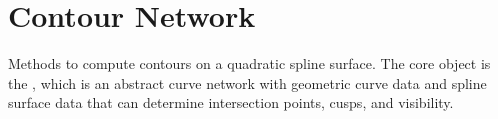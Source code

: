 \chapter{Contour Network}
\hypertarget{md_src_2contour__network_2_r_e_a_d_m_e}{}\label{md_src_2contour__network_2_r_e_a_d_m_e}
\label{md_src_2contour__network_2_r_e_a_d_m_e_autotoc_md0}%
%
 Methods to compute contours on a quadratic spline surface. The core object is the {\ttfamily {}}, which is an abstract curve network with geometric curve data and spline surface data that can determine intersection points, cusps, and visibility. 
